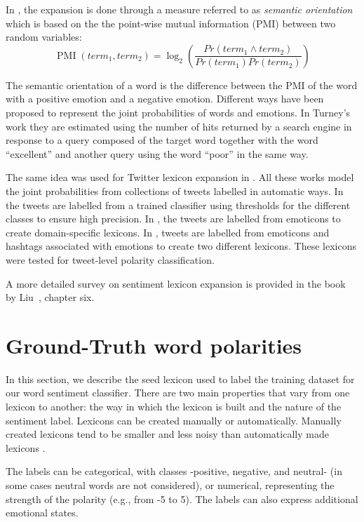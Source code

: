 \documentclass{sig-alternate}
\begin{document}
In \cite{Turney2002, turney2003measuring}, the expansion is done through a measure referred to as \emph{semantic orientation} which is based on the the point-wise mutual information (PMI) between two random variables:
\begin{equation}
 \operatorname{PMI}(term_{1}, term_{2})= \log_{2} \left ( \frac{Pr(term_{1} \wedge term_{2})}{Pr(term_{1})Pr(term_{2})} \right )
\end{equation}

The semantic orientation of a word is the difference between the PMI of the word with a positive emotion and a negative emotion. Different ways have been proposed to represent the joint probabilities of words and emotions. In Turney's work \cite{Turney2002} they are estimated using the number of hits returned by a search engine in response to a query composed of the target word together with the word ``excellent'' and another query using the word ``poor'' in the same way.  

The same idea was used for Twitter lexicon expansion in \cite{Mohammad2013, avaya2013, Zhou2014}. All these works model the joint probabilities from collections of tweets labelled in automatic ways. In \cite{avaya2013} the tweets are labelled from a trained classifier using thresholds for the different classes to ensure high precision. In \cite{Zhou2014}, the tweets are labelled from emoticons to create domain-specific lexicons. In \cite{Mohammad2013}, tweets are labelled from emoticons and hashtags associated with emotions to create two different lexicons. These lexicons were tested for tweet-level polarity classification. 

A more detailed survey on sentiment lexicon expansion is provided in the book by Liu~\cite{LiuBook}, chapter six. 


\section{Ground-Truth word polarities}\label{sec:seed_lex}
In this section, we describe the seed lexicon used to label the training dataset for our word sentiment classifier. There are two main properties that vary from one lexicon to another: the way in which the lexicon is built and the nature of the sentiment label. Lexicons can be created manually or automatically. Manually created lexicons tend to be smaller and less noisy than automatically made lexicons \cite{BravoMarquez2014}. 

 The labels can be categorical, with classes -positive, negative, and neutral- (in some cases neutral words are not considered), or numerical, representing the strength of the polarity (e.g., from -5 to 5). The labels can also express additional emotional states.
\end{document}
